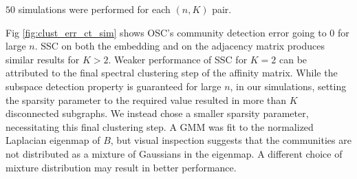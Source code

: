 \documentclass[12pt]{article}
\begin{document}
\(50\) simulations were performed for each \((n, K)\) pair.

Fig \ref{fig:clust_err_ct_sim} shows OSC's community detection error
going to 0 for large \(n\). SSC on both the embedding and on the
adjacency matrix produces similar results for \(K > 2\). Weaker
performance of SSC for \(K = 2\) can be attributed to the final spectral
clustering step of the affinity matrix. 
While the subspace detection property is guaranteed for large \(n\), in our
simulations, setting the sparsity parameter to the required value resulted
in more than \(K\) disconnected subgraphs. 
We instead chose a smaller sparsity parameter, 
necessitating this final clustering step. 
A GMM was fit to the normalized Laplacian eigenmap of $B$,
but visual inspection suggests that the communities are not
distributed as a mixture of Gaussians in the eigenmap. 
A different choice of mixture distribution may result in better performance. 
\end{document}
